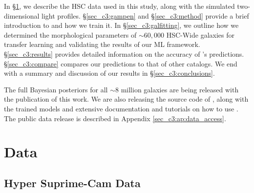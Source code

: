 In \S \ref{sec_c3:data}, we describe the HSC data used in this study, along with the simulated two-dimensional light profiles. \S \ref{sec_c3:gampen} and \S \ref{sec_c3:method} provide a brief introduction to \gampen{} and how we train it. In \S \ref{sec_c3:galfitting}, we outline how we determined the morphological parameters of $\sim60,000$ HSC-Wide galaxies for transfer learning and validating the results of our ML framework. \S \ref{sec_c3:results} provides detailed information on the accuracy of \gampen{}'s predictions. \S \ref{sec_c3:compare} compares our predictions to that of other catalogs. We end with a summary and discussion of our results in \S \ref{sec_c3:conclusions}.

The full Bayesian posteriors for all $\sim 8$ million galaxies are being released with the publication of this work. We are also releasing the source code of \gampen{}, along with the trained models and extensive documentation and tutorials on how to use \gampen{}. The public data release is described in Appendix \ref{sec_c3:ap:data_access}.

\section{Data} \label{sec_c3:data}

\subsection{Hyper Suprime-Cam Data} \label{sec_c3:hsc_data}

